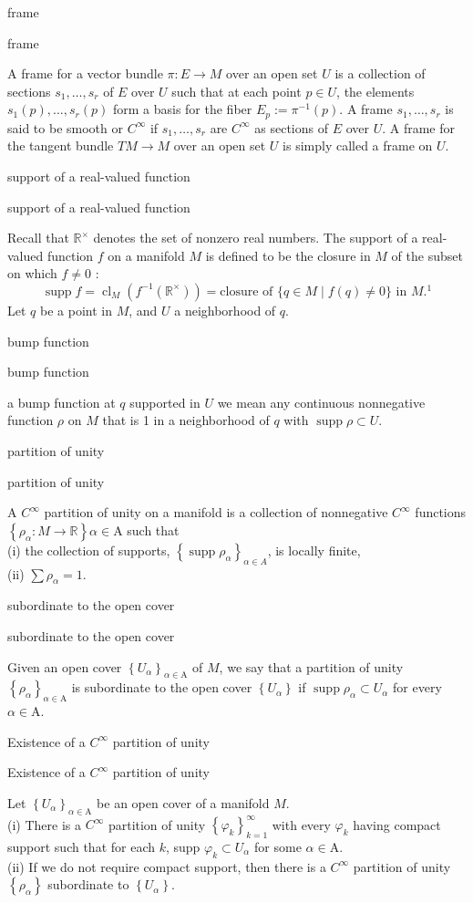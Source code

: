 \documentclass[17pt]{extarticle}
\newcommand{\boxset}[2]{\begin{mdframed}[style=darkQuesion]
#1
\end{mdframed}
\newpage
\begin{mdframed}[style=darkQuesion]
  #1
    \end{mdframed}
\begin{mdframed}[style=darkAnswer]
  #2
    \end{mdframed}
    \newpage
}
\begin{document}
\boxset{frame}
{A frame for a vector bundle $\pi: E \rightarrow M$ over an open set $U$ is a collection of sections $s_{1}, \ldots, s_{r}$ of $E$ over $U$ such that at each point $p \in U$, the elements $s_{1}(p), \ldots, s_{r}(p)$ form a basis for the fiber $E_{p}:=\pi^{-1}(p)$. A frame $s_{1}, \ldots, s_{r}$ is said to be smooth or $C^{\infty}$
if $s_{1}, \ldots, s_{r}$ are $C^{\infty}$ as sections of $E$ over $U$. A frame for the tangent bundle $T M \rightarrow M$ over an open set $U$ is simply called a frame on $U$.}
\boxset{support of a real-valued function}
{Recall that $\mathbb{R}^{\times}$ denotes the set of nonzero real numbers. The support of a real-valued function $f$ on a manifold $M$ is defined to be the closure in $M$ of the subset on which $f \neq 0$ :
\[\operatorname{supp} f=\operatorname{cl}_{M}\left(f^{-1}\left(\mathbb{R}^{\times}\right)\right)=\text {closure of }\{q \in M \mid f(q) \neq 0\} \text { in } M .{ }^{1}\]
Let $q$ be a point in $M$, and $U$ a neighborhood of $q$. }
\boxset{bump function }
{a bump function at $q$ supported in $U$ we mean any continuous nonnegative function $\rho$ on $M$ that is 1 in a neighborhood of $q$ with $\operatorname{supp} \rho \subset U$.}
\boxset{partition of unity}
{A $C^{\infty}$ partition of unity on a manifold is a collection of nonnegative $C^{\infty}$ functions $\left\{\rho_{\alpha}: M \rightarrow \mathbb{R}\right\} \alpha \in \mathrm{A}$ such that\[\ \]
(i) the collection of supports, $\left\{\operatorname{supp} \rho_{\alpha}\right\}_{\alpha \in A}$, is locally finite,\[\ \]
(ii) $\sum \rho_{\alpha}=1$.}
\boxset{subordinate to the open cover}
{Given an open cover $\left\{U_{\alpha}\right\}_{\alpha \in \mathrm{A}}$ of $M$, we say that a partition of unity $\left\{\rho_{\alpha}\right\}_{\alpha \in \mathrm{A}}$ is subordinate to the open cover $\left\{U_{\alpha}\right\}$ if $\operatorname{supp} \rho_{\alpha} \subset U_{\alpha}$ for every $\alpha \in \mathrm{A}$.}
\boxset{Existence of a $C^{\infty}$ partition of unity}
{Let $\left\{U_{\alpha}\right\}_{\alpha \in \mathrm{A}}$ be an open cover of a manifold $M$.\[\ \]
(i) There is a $C^{\infty}$ partition of unity $\left\{\varphi_{k}\right\}_{k=1}^{\infty}$ with every $\varphi_{k}$ having compact support such that for each $k$, supp $\varphi_{k} \subset U_{\alpha}$ for some $\alpha \in \mathrm{A}$.\[\ \]
(ii) If we do not require compact support, then there is a $C^{\infty}$ partition of unity $\left\{\rho_{\alpha}\right\}$ subordinate to $\left\{U_{\alpha}\right\}$.}
\boxset{ }
{}
\boxset{ }
{}
\boxset{ }
{}
\boxset{ }
{}
\boxset{ }
{}
\boxset{ }
{}
\end{document}
